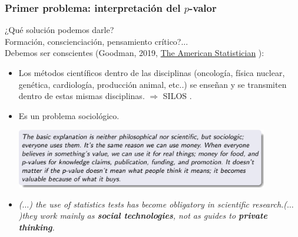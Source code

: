 \documentclass[9pt]{beamer}
\begin{document}
\begin{frame}
  \frametitle{Primer problema: interpretación del $p$-valor}
    \begin{overlayarea}{\textwidth}{0.8\textheight}
  ¿Qué solución podemos darle?\\
  Formación, conscienciación, pensamiento crítico?...\\
  Debemos ser conscientes (Goodman,
  2019, \href{https://doi.org/10.1080/00031305.2018.1558111}{The American Statistician} ):
  \begin{itemize}
  \item Los métodos científicos dentro de las disciplinas
    (oncología, física nuclear, genética, cardiología, producción
    animal, etc..) se enseñan y se transmiten dentro de estas mismas
    disciplinas. {$\Rightarrow$ SILOS .}
  \item Es un problema sociológico. 
    \begin{center}
      \includegraphics[width=11cm]{images/goodman_0}
    \end{center}      
  \item<2-> \textit{($\ldots$) the use of statistics tests has become
      obligatory in scientific research.($\ldots$)they work mainly as \textbf{social technologies}, not as guides to \textbf{private thinking}.
} 
  \end{itemize}
  
\end{overlayarea}
\end{frame}
\end{document}
